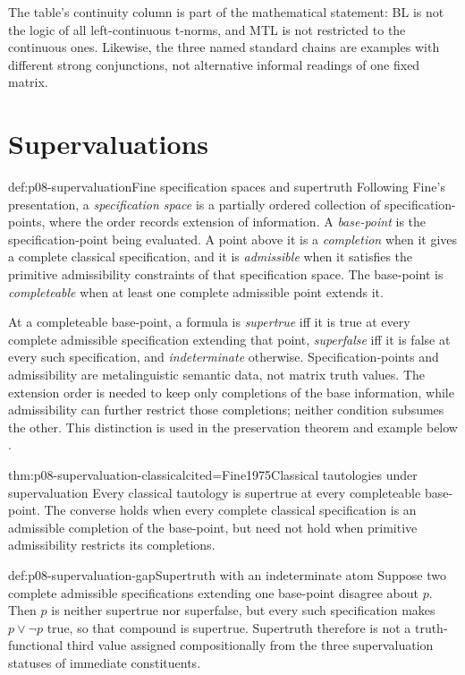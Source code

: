 The table's continuity column is part of the mathematical statement: BL is not
the logic of all left-continuous t-norms, and MTL is not restricted to the
continuous ones.  Likewise, the three named standard chains are examples with
different strong conjunctions, not alternative informal readings of one fixed
matrix.

\section{Supervaluations}

\begin{hbdefinition}{def:p08-supervaluation}{Fine specification spaces and supertruth}
Following Fine's presentation, a \emph{specification space} is a partially
ordered collection of specification-points, where the order records extension
of information.  A \emph{base-point} is the specification-point being
evaluated.  A point above it is a \emph{completion} when it gives a complete
classical specification, and it is \emph{admissible} when it satisfies the
primitive admissibility constraints of that specification space.  The
base-point is \emph{completeable} when at least one complete admissible point
extends it.

At a completeable base-point, a formula is \emph{supertrue} iff it is true at
every complete admissible specification extending that point,
\emph{superfalse} iff it is false at every such specification, and
\emph{indeterminate} otherwise.  Specification-points and admissibility are
metalinguistic semantic data, not matrix truth values.  The extension order is
needed to keep only completions of the base information, while admissibility
can further restrict those completions; neither condition subsumes the other.
This distinction is used in the preservation theorem and example below
\cite{Fine1975}.
\end{hbdefinition}

\begin{hbtheorem}{thm:p08-supervaluation-classical}{cited=Fine1975}{Classical tautologies under supervaluation}
Every classical tautology is supertrue at every completeable base-point.  The
converse holds when every complete classical specification is an admissible
completion of the base-point, but need not hold when primitive admissibility
restricts its completions.
\end{hbtheorem}

\begin{hbexample}{def:p08-supervaluation-gap}{Supertruth with an indeterminate atom}
Suppose two complete admissible specifications extending one base-point
disagree about \(p\).  Then \(p\) is neither supertrue nor superfalse, but every
such specification makes
\(p\lor\neg p\) true, so that compound is supertrue.  Supertruth therefore is
not a truth-functional third value assigned compositionally from the three
supervaluation statuses of immediate constituents.
\end{hbexample}

